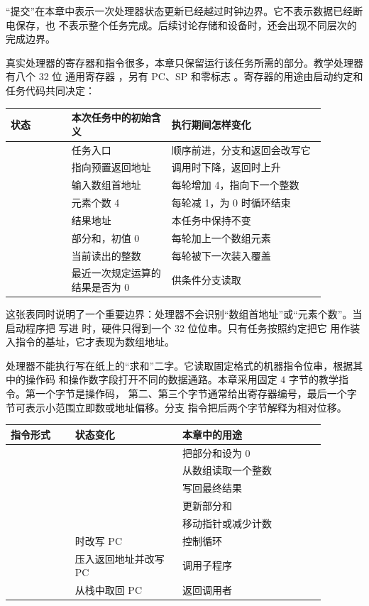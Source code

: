 “提交”在本章中表示一次处理器状态更新已经越过时钟边界。它不表示数据已经断电保存，也
不表示整个任务完成。后续讨论存储和设备时，还会出现不同层次的完成边界。


真实处理器的寄存器和指令很多，本章只保留运行该任务所需的部分。教学处理器有八个 32 位
通用寄存器 ，另有 PC、SP 和零标志 。寄存器的用途由启动约定和
任务代码共同决定：

\begin{longtable}{|L{0.17\linewidth}|L{0.28\linewidth}|L{0.43\linewidth}|}
\hline
{}
状态 & 本次任务中的初始含义 & 执行期间怎样变化 \\ \hline
{} & 任务入口  & 顺序前进，分支和返回会改写它 \\ \hline
{} & 指向预置返回地址 & 调用时下降，返回时上升 \\ \hline
{} & 输入数组首地址  & 每轮增加 4，指向下一个整数 \\ \hline
{} & 元素个数 4 & 每轮减 1，为 0 时循环结束 \\ \hline
{} & 结果地址  & 本任务中保持不变 \\ \hline
{} & 部分和，初值 0 & 每轮加上一个数组元素 \\ \hline
{} & 当前读出的整数 & 每轮被下一次装入覆盖 \\ \hline
{} & 最近一次规定运算的结果是否为 0 & 供条件分支读取 \\ \hline
\end{longtable}

这张表同时说明了一个重要边界：处理器不会识别“数组首地址”或“元素个数”。当启动程序把
 写进  时，硬件只得到一个 32 位位串。只有任务按照约定把它
用作装入指令的基址，它才表现为数组地址。


处理器不能执行写在纸上的“求和”二字。它读取固定格式的机器指令位串，根据其中的操作码
和操作数字段打开不同的数据通路。本章采用固定 4 字节的教学指令。第一个字节是操作码，
第二、第三个字节通常给出寄存器编号，最后一个字节可表示小范围立即数或地址偏移。分支
指令把后两个字节解释为相对位移。

\begin{longtable}{|L{0.18\linewidth}|L{0.30\linewidth}|L{0.40\linewidth}|}
\hline
{}
指令形式 & 状态变化 & 本章中的用途 \\ \hline
{} &  & 把部分和设为 0 \\ \hline
{} &  & 从数组读取一个整数 \\ \hline
{} &  & 写回最终结果 \\ \hline
{} &  & 更新部分和 \\ \hline
{} &  & 移动指针或减少计数 \\ \hline
{} &  时改写 PC & 控制循环 \\ \hline
{} & 压入返回地址并改写 PC & 调用子程序 \\ \hline
{} & 从栈中取回 PC & 返回调用者 \\ \hline
\end{longtable}

